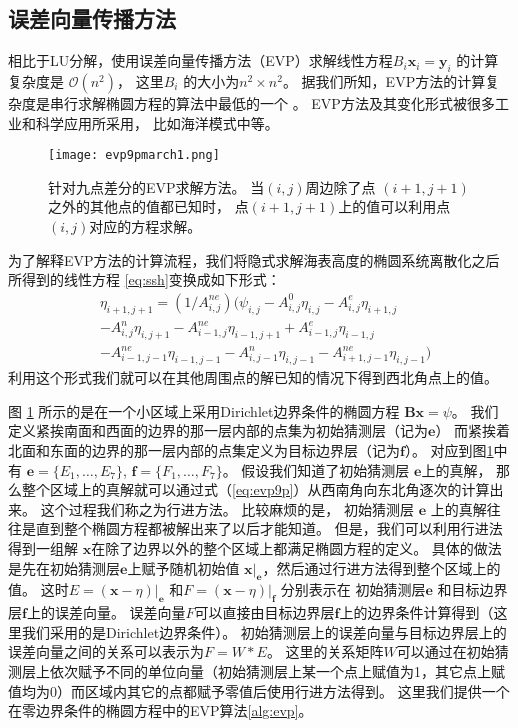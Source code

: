  

\subsection{误差向量传播方法}
\label{precond:EVP:EVP}

相比于LU分解，使用误差向量传播方法（EVP）求解线性方程$B_i \textbf{x}_i =\textbf{y}_i$ 的计算复杂度是 $\mathcal{O}(n^2)$， 这里$B_i$ 的大小为$n^2\times n^2$。 
据我们所知，EVP方法的计算复杂度是串行求解椭圆方程的算法中最低的一个 \cite{roache1995elliptic}。 
EVP方法及其变化形式被很多工业和科学应用所采用， 比如海洋模式中\cite{dietrich1987ocean,tseng2011parallel}等。 


\begin {figure}
\centering
\texttt{[image: evp9pmarch1.png]}
\caption []{针对九点差分的EVP求解方法。 当$(i,j)$周边除了点 $(i+1,j+1)$之外的其他点的值都已知时， 点$(i+1,j+1)$上的值可以利用点$(i,j)$对应的方程求解。 \label {fig:evp9p}}
\end {figure}

为了解释EVP方法的计算流程，我们将隐式求解海表高度的椭圆系统离散化之后所得到的线性方程 \ref{eq:ssh}变换成如下形式：
\begin{eqnarray}
\label{eq:evp9p}
&\eta_{i+1,j+1} = (1/A_{i,j}^{ne} )(\psi_{i,j} - A_{i,j}^0\eta_{i,j}-A_{i,j}^e\eta_{i+1,j} \nonumber\\
&-A_{i,j}^n\eta_{i,j+1}-A_{i-1,j}^{ne}\eta_{i-1,j+1} +A_{i-1,j}^e\eta_{i-1,j}\nonumber\\
&-A_{i-1,j-1}^{ne}\eta_{i-1,j-1}-A_{i,j-1}^n\eta_{i,j-1}- A_{i+1,j-1}^{ne}\eta_{i,j-1} )
\end{eqnarray}
利用这个形式我们就可以在其他周围点的解已知的情况下得到西北角点上的值。 


图 \ref{fig:evp9p} 所示的是在一个小区域上采用Dirichlet边界条件的椭圆方程
 $\textbf{B}\textbf{x} = \psi$。
我们定义紧挨南面和西面的边界的那一层内部的点集为初始猜测层（记为$\textbf{e}$） 
而紧挨着北面和东面的边界的那一层内部的点集定义为目标边界层（记为$\textbf{f}$）。 
对应到图\ref{fig:evp9p}中有
$\textbf{e}= \{E_1, \dots, E_7\}$, $\textbf{f}= \{F_1, \dots, F_7\}$。 
假设我们知道了初始猜测层 $\textbf{e}$上的真解，  
那么整个区域上的真解就可以通过式（\ref{eq:evp9p}）从西南角向东北角逐次的计算出来。 
这个过程我们称之为行进方法。
比较麻烦的是， 初始猜测层 $\textbf{e}$ 上的真解往往是直到整个椭圆方程都被解出来了以后才能知道。
但是，我们可以利用行进法得到一组解
$\textbf{x}$在除了边界以外的整个区域上都满足椭圆方程的定义。 
具体的做法是先在初始猜测层$\textbf{e}$上赋予随机初始值
$\textbf{x}|_\textbf{e}$，然后通过行进方法得到整个区域上的值。 
这时$E=(\textbf{x} -\eta)|_\textbf{e}$
和$F=(\textbf{x} -\eta)|_\textbf{f}$ 分别表示在
初始猜测层$\textbf{e}$ 和目标边界层$\textbf{f}$上的误差向量。
误差向量$F$可以直接由目标边界层$\textbf{f}$上的边界条件计算得到（这里我们采用的是Dirichlet边界条件）。 
初始猜测层上的误差向量与目标边界层上的误差向量之间的关系可以表示为$F=W*E$。
这里的关系矩阵$W$可以通过在初始猜测层上依次赋予不同的单位向量（初始猜测层上某一个点上赋值为1，其它点上赋值均为0）而区域内其它的点都赋予零值后使用行进方法得到。 
这里我们提供一个在零边界条件的椭圆方程中的EVP算法\ref{alg:evp}。 


